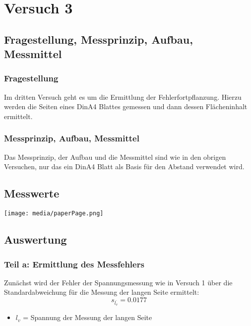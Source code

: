 \chapter{Versuch 3}
\label{chap:VERSUCH_3}

\section{Fragestellung, Messprinzip, Aufbau, Messmittel}
\label{chap:VERSUCH_3_FRAGESTELLUNG}

\subsection{Fragestellung}
Im dritten Versuch geht es um die Ermittlung der Fehlerfortpflanzung. Hierzu werden die Seiten eines DinA4 Blattes gemessen und dann dessen Flächeninhalt ermittelt.

\subsection{Messprinzip, Aufbau, Messmittel}
\label{subSec:MAM}
Das Messprinzip, der Aufbau und die Messmittel sind wie in den obrigen Versuchen, nur das ein DinA4 Blatt als Basis für den Abstand verwendet wird.

\section{Messwerte}
\label{chap:VERSUCH_3_MESSWERTE}

\texttt{[image: media/paperPage.png]}
\label{fig:WerteDinA4}

\section{Auswertung}
\label{chap:VERSUCH_3_AUSWERTUNG}

\subsection{Teil a: Ermittlung des Messfehlers}
\label{subS:Versuch3a}
Zunächst wird der Fehler der Spannungsmessung wie in Versuch 1 über die Standardabweichung für die Messung der langen Seite ermittelt:
\begin{equation}
	s_{\bar{l_v}} = 0.0177
\end{equation}
\begin{itemize}
	\item $l_v$ = Spannung der Messung der langen Seite
\end{itemize}


